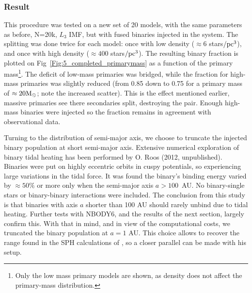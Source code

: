 \subsubsection*{Result}

This procedure was tested on a new set of 20 \HubLem models, with the same parameters as before, N=20k, $L_3$ IMF, but with fused binaries injected in the system. The splitting was done twice for each model:  once with low density ($\approx 6$ stars$/{\textrm{pc}}^3$), and once with high density ($\approx 400$ stars$/{\textrm{pc}}^3$). The resulting binary fraction is plotted on Fig~\ref{Fig:5_completed_primarymass} as a function of the primary mass\footnote{Only the low mass primary models are shown, as density does not affect the primary-mass distribution.}. The deficit of low-mass primaries was bridged, while the fraction for high-mass primaries was slightly reduced (from 0.85 down to 0.75 for a primary mass of $\approx 20 {\textrm{M}_\odot}$; note the increased scatter). This is the effect mentioned earlier, massive primaries see there secondaries split, destroying the pair. Enough high-mass binaries were injected so the fraction remains in agreement with observational data.

Turning to the distribution of semi-major axis, we choose to truncate the injected binary population at short semi-major axis. Extensive numerical exploration of binary tidal heating has been performed by O. Roos (2012, unpublished). Binaries were put on highly eccentric orbits in cuspy \cite{Dehnen1993} potentials, so experiencing large variations in the tidal force. It was found the binary's binding energy varied by $ \approx 50\%$ or more only when the semi-major axis $a >  100$~AU. No binary-single stars or binary-binary interactions were included. The conclusion from this study is that binaries with axis $a$ shorter than 100 AU should rarely unbind due to tidal heating. Further tests with NBODY6, and the results of the next section, largely confirm this. With that in mind, and in view of the computational costs, we truncated the binary population at $a = 1$ AU. This choice allows to recover the range found in the SPH calculations of \cite{Bate2012}, so a closer parallel can be made with his setup. 


